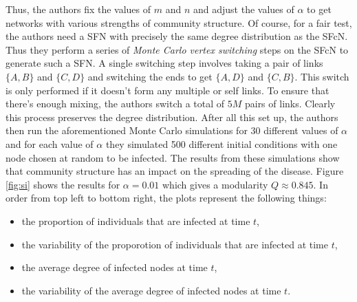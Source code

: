 Thus, the authors fix the values of $m$ and $n$ and adjust the values of $\alpha$ to get networks with various strengths of community structure. Of course, for a fair test, the authors need a SFN with precisely the same degree distribution as the SFcN. Thus they perform a series of \emph{Monte Carlo vertex switching} steps on the SFcN to generate such a SFN. A single switching step involves taking a pair of links $\{A, B\}$ and $\{C, D\}$ and switching the ends to get $\{A, D\}$ and $\{C, B\}$. This switch is only performed if it doesn't form any multiple or self links. To ensure that there's enough mixing, the authors switch a total of $5M$ pairs of links. Clearly this process preserves the degree distribution. After all this set up, the authors then run the aforementioned Monte Carlo simulations for 30 different values of $\alpha$ and for each value of $\alpha$ they simulated 500 different initial conditions with one node chosen at random to be infected. The results from these simulations show that community structure has an impact on the spreading of the disease. Figure \ref{fig:si} shows the results for $\alpha = 0.01$ which gives a modularity $Q \approx 0.845$. In order from top left to bottom right, the plots represent the following things:

\begin{itemize}
    \item the proportion of individuals that are infected at time $t$,
    \item the variability of the proporotion of individuals that are infected at time $t$,
    \item the average degree of infected nodes at time $t$,
    \item the variability of the average degree of infected nodes at time $t$.
\end{itemize}


